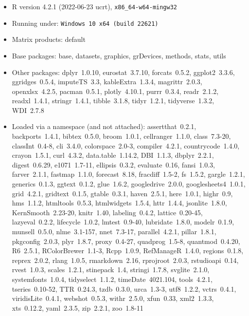\documentclass[
  12pt,
]{article}
\numberwithin{equation}{section}
\numberwithin{table}{section}
\numberwithin{figure}{section}
\begin{document}
\footnotesize

\begin{itemize}\raggedright
  \item R version 4.2.1 (2022-06-23 ucrt), \verb|x86_64-w64-mingw32|
  \item Running under: \verb|Windows 10 x64 (build 22621)|
  \item Matrix products: default
  \item Base packages: base, datasets, graphics, grDevices, methods,
    stats, utils
  \item Other packages: dplyr~1.0.10, eurostat~3.7.10, forcats~0.5.2,
    ggplot2~3.3.6, ggridges~0.5.4, imputeTS~3.3, kableExtra~1.3.4,
    magrittr~2.0.3, openxlsx~4.2.5, pacman~0.5.1, plotly~4.10.1,
    purrr~0.3.4, readr~2.1.2, readxl~1.4.1, stringr~1.4.1,
    tibble~3.1.8, tidyr~1.2.1, tidyverse~1.3.2, WDI~2.7.8
  \item Loaded via a namespace (and not attached): assertthat~0.2.1,
    backports~1.4.1, bibtex~0.5.0, broom~1.0.1, cellranger~1.1.0,
    class~7.3-20, classInt~0.4-8, cli~3.4.0, colorspace~2.0-3,
    compiler~4.2.1, countrycode~1.4.0, crayon~1.5.1, curl~4.3.2,
    data.table~1.14.2, DBI~1.1.3, dbplyr~2.2.1, digest~0.6.29,
    e1071~1.7-11, ellipsis~0.3.2, evaluate~0.16, fansi~1.0.3,
    farver~2.1.1, fastmap~1.1.0, forecast~8.18, fracdiff~1.5-2,
    fs~1.5.2, gargle~1.2.1, generics~0.1.3, ggtext~0.1.2, glue~1.6.2,
    googledrive~2.0.0, googlesheets4~1.0.1, grid~4.2.1, gridtext~0.1.5,
    gtable~0.3.1, haven~2.5.1, here~1.0.1, highr~0.9, hms~1.1.2,
    htmltools~0.5.3, htmlwidgets~1.5.4, httr~1.4.4, jsonlite~1.8.0,
    KernSmooth~2.23-20, knitr~1.40, labeling~0.4.2, lattice~0.20-45,
    lazyeval~0.2.2, lifecycle~1.0.2, lmtest~0.9-40, lubridate~1.8.0,
    modelr~0.1.9, munsell~0.5.0, nlme~3.1-157, nnet~7.3-17,
    parallel~4.2.1, pillar~1.8.1, pkgconfig~2.0.3, plyr~1.8.7,
    proxy~0.4-27, quadprog~1.5-8, quantmod~0.4.20, R6~2.5.1,
    RColorBrewer~1.1-3, Rcpp~1.0.9, RefManageR~1.4.0, regions~0.1.8,
    reprex~2.0.2, rlang~1.0.5, rmarkdown~2.16, rprojroot~2.0.3,
    rstudioapi~0.14, rvest~1.0.3, scales~1.2.1, stinepack~1.4,
    stringi~1.7.8, svglite~2.1.0, systemfonts~1.0.4, tidyselect~1.1.2,
    timeDate~4021.104, tools~4.2.1, tseries~0.10-52, TTR~0.24.3,
    tzdb~0.3.0, urca~1.3-3, utf8~1.2.2, vctrs~0.4.1, viridisLite~0.4.1,
    webshot~0.5.3, withr~2.5.0, xfun~0.33, xml2~1.3.3, xts~0.12.2,
    yaml~2.3.5, zip~2.2.1, zoo~1.8-11
\end{itemize}

\normalsize
\singlespacing
\listoffigures
\listoftables

\def\bibpreamble{All online resources were last accessed on 12 December 2022.}
\footnotesize

  
\end{document}
